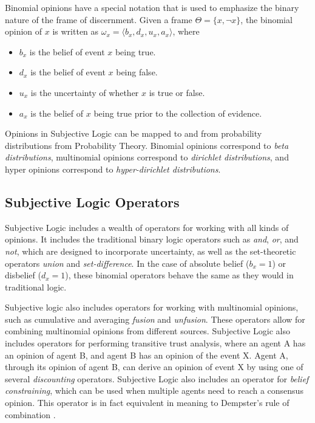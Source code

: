 \documentclass[thesis.tex]{subfiles}
\begin{document}
Binomial opinions have a special notation that is used to emphasize the binary nature of the frame of
discernment. Given a frame $\Theta = \lbrace x, \lnot x \rbrace$, the binomial opinion of $x$ is written
as $\omega_x = \langle b_x, d_x, u_x, a_x \rangle$, where

\begin{itemize}
  \item $b_x$ is the belief of event $x$ being true.
  \item $d_x$ is the belief of event $x$ being false.
  \item $u_x$ is the uncertainty of whether $x$ is true or false.
  \item $a_x$ is the belief of $x$ being true prior to the collection of evidence.
\end{itemize}

Opinions in Subjective Logic can be mapped to and from probability distributions from Probability
Theory. Binomial opinions correspond to \emph{beta distributions}, multinomial opinions correspond
to \emph{dirichlet distributions}, and hyper opinions correspond to \emph{hyper-dirichlet distributions}.





\subsection{Subjective Logic Operators}

Subjective Logic includes a wealth of operators for working with all kinds of opinions. It includes
the traditional binary logic operators such as \emph{and}, \emph{or}, and \emph{not}, which are
designed to incorporate uncertainty, as well as the set-theoretic operators \emph{union} and
\emph{set-difference}. In the case of absolute belief ($b_x = 1$) or disbelief ($d_x =1$), these
binomial operators behave the same as they would in traditional logic.

Subjective logic also includes operators for working with multinomial opinions, such as
cumulative and averaging \emph{fusion} and \emph{unfusion}. These operators allow for combining
multinomial opinions from different sources. Subjective Logic also includes operators for performing
transitive trust analysis, where an agent A has an opinion of agent B, and agent B has an opinion of
the event X. Agent A, through its opinion of agent B, can derive an opinion of event X by using one
of several \emph{discounting} operators. Subjective Logic also includes an operator for
\emph{belief constraining}, which can be used when multiple agents need to reach a consensus opinion.
This operator is in fact equivalent in meaning to Dempster's rule of combination \cite{josang2012dempster}.
\end{document}
